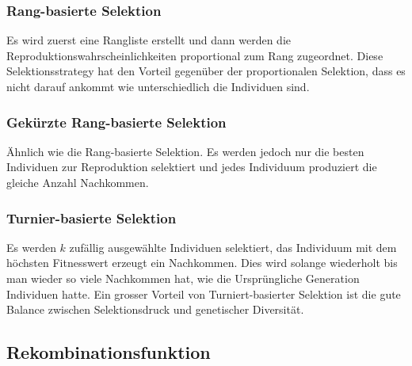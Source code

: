         
      \subsubsection{Rang-basierte Selektion}

        Es wird zuerst eine Rangliste erstellt und dann werden die Reproduktionswahrscheinlichkeiten proportional zum Rang zugeordnet.
        Diese Selektionsstrategy hat den Vorteil gegenüber der proportionalen Selektion,
        dass es nicht darauf ankommt wie unterschiedlich die Individuen sind.

      \subsubsection{Gekürzte Rang-basierte Selektion}

        Ähnlich wie die Rang-basierte Selektion.
        Es werden jedoch nur die besten Individuen zur Reproduktion selektiert und
        jedes Individuum produziert die gleiche Anzahl Nachkommen.

      \subsubsection{Turnier-basierte Selektion\label{par:Turnier}}

        Es werden \(k\) zufällig ausgewählte Individuen selektiert,
        das Individuum mit dem höchsten Fitnesswert erzeugt ein Nachkommen.
        Dies wird solange wiederholt bis man wieder so viele Nachkommen hat,
        wie die Ursprüngliche Generation Individuen hatte.
        Ein grosser Vorteil von Turniert-basierter Selektion ist die gute Balance zwischen
        Selektionsdruck und genetischer Diversität.

    \subsection{Rekombinationsfunktion}

